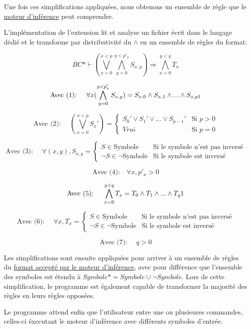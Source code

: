 \documentclass[12pt]{article}
\begin{document}
Une fois ces simplifications appliquées, nous obtenons un ensemble de règle que le \hyperref[MI]{moteur d'inférence} peut comprendre.

L'implémentation de l'extension lit et analyse un fichier écrit dans le langage dédié et le transforme par distributivité du $\land$ en un ensemble de règles du format:

\[BC* \vdash (\bigvee_{x=0}^{x < p}\bigwedge_{y=0}^{y < p'_x} S_{x,y}) \Rightarrow \bigwedge_{x=0}^{y < q} T_x\]

\[\text{Avec (1): } \quad \forall x (\bigwedge_{y=0}^{y < p'_x} S_{x,y}) =
  S_{x,0} \land S_{x,1} \land ... \land S_{x,p\-1}
\]

\[\text{Avec (2): } \quad (\bigvee_{x=0}^{x < p} S_x') = \begin{cases}
  S_0' \lor S_1' \lor ... \lor S_{p-1}' & \text{Si } p > 0 \\
  Vrai & \text{Si } p = 0
\end{cases}
\]

\[\text{Avec (3): } \quad \forall (x, y), S_{x,y} = \begin{cases}
  S \in \text{Symbole} & \text{Si le symbole n'est pas inversé} \\
  \neg S \in \neg \text{Symbole} & \text{Si le symbole est inversé}
\end{cases}
\]

\[\text{Avec (4):} \quad \forall x, p'_x > 0\]

\[\text{Avec (5): } \quad \bigwedge_{x=0}^{y < q} T_x =
  T_0 \land T_1 \land ... \land T_q\-1
\]

\[\text{Avec (6): } \quad \forall x, T_x = \begin{cases}
  S \in \text{Symbole} & \text{Si le symbole n'est pas inversé} \\
  \neg S \in \neg \text{Symbole} & \text{Si le symbole est inversé}
\end{cases}
\]

\[\text{Avec (7): } \quad q > 0\]

Les simplifications sont ensuite appliquées pour arriver à un ensemble de règles du \hyperref[MI]{format accepté par le moteur d'inférence}, avec pour différence que l'ensemble des symboles est étendu à $Symbole* = Symbole \cup \neg Symbole$.
Lors de cette simplification, le programme est également capable de transformer la majorité des règles en leurs règles opposées.

Le programme attend enfin que l'utilisateur entre une ou plusieures commandes, celles-ci éxecutant le moteur d'inférence avec différents symboles d'entrée.
\end{document}
